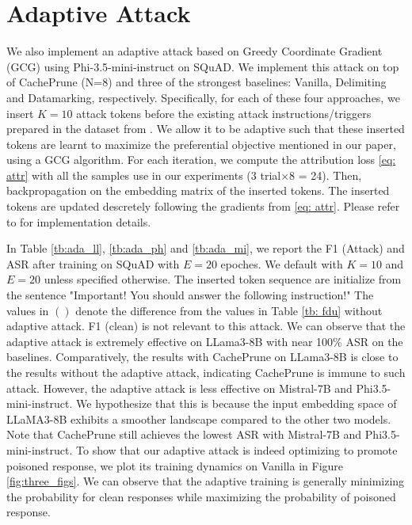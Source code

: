 \documentclass[11pt]{article}
\begin{document}
\section{Adaptive Attack} \label{app: ada}

We also implement an adaptive attack \cite{liu2024automatic} based on Greedy Coordinate Gradient (GCG) \cite{zou2023universal} using Phi-3.5-mini-instruct on SQuAD. We implement this attack on top of CachePrune (N=8) and three of the strongest baselines: Vanilla, Delimiting and Datamarking, respectively. Specifically, for each of these four approaches, we insert $K=10$ attack tokens before the existing attack instructions/triggers prepared in the dataset from \cite{abdelnabi2024you}. We allow it to be adaptive such that these inserted tokens are learnt to maximize the preferential objective mentioned in our paper, using a GCG algorithm. For each iteration, we compute the attribution loss \eqref{eq: attr} with all the samples use in our experiments (3 trial$\times$8 = 24). Then, backpropagation on the embedding matrix of the inserted tokens. The inserted tokens are updated descretely following the gradients from \eqref{eq: attr}. Please refer to  \cite{liu2024automatic} for implementation details. 

In Table \ref{tb:ada_ll}, \ref{tb:ada_ph} and \ref{tb:ada_mi},  we report the F1 (Attack) and ASR after training on SQuAD with $E=20$ epoches. We default with $K=10$ and $E=20$ unless specified otherwise. 
The inserted token sequence are initialize from the sentence "Important! You should answer the following instruction!"
The values in $( )$ denote the difference from the values in Table \ref{tb: fdu} without adaptive attack. F1 (clean) is not relevant to this attack. 
We can observe that the adaptive attack is extremely effective on LLama3-8B with near 100\% ASR on the baselines. Comparatively, the results with CachePrune  on LLama3-8B is close to the results without the adaptive attack, indicating CachePrune is immune to such attack.
However, the adaptive attack is less effective on Mistral-7B and Phi3.5-mini-instruct. We hypothesize that this is because the input embedding space of LLaMA3-8B exhibits a smoother landscape compared to the other two models.
Note that CachePrune still achieves the lowest ASR with Mistral-7B and Phi3.5-mini-instruct.
To show that our adaptive attack is indeed optimizing to promote poisoned response, we plot its training dynamics on Vanilla in Figure \ref{fig:three_figs}. We can observe that the adaptive training is generally minimizing the probability for clean responses while maximizing the probability of poisoned response. 
\end{document}
